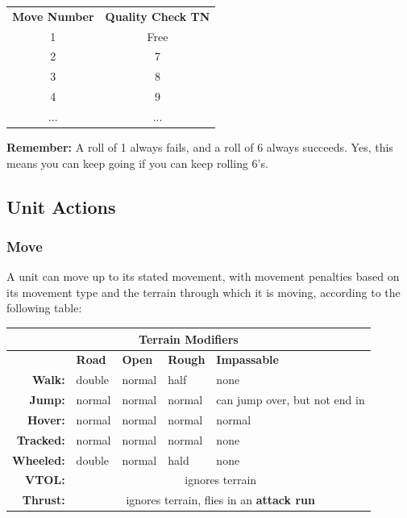\documentclass[12pt,titlepage]{article}
\begin{document}
\begin{multicols}{2}
  \begin{tabular}{cc}
    {\bf Move Number} & {\bf Quality Check TN} \\
    1 & Free \\
    2 & 7 \\
    3 & 8 \\
    4 & 9 \\
    ... & ... \\
  \end{tabular}
      {\bf Remember:} A roll of 1 always fails, and a roll of 6 always
      succeeds. Yes, this means you can keep going if you can keep rolling
      6's.

      \subsection{Unit Actions}
      
      \subsubsection{Move}
      A unit can move up to its stated movement, with movement penalties
      based on its movement type and the terrain through which it is
      moving, according to the following table:

\end{multicols}
\begin{tabular}{rllll}
  \multicolumn{5}{c}{\bf Terrain Modifiers}\\
  \hline
  & {\bf Road} & {\bf Open} & {\bf Rough} & {\bf Impassable} \\
      {\bf Walk:} & double & normal & half & none \\
      {\bf Jump:} & normal & normal & normal & can jump over, but
      not end in \\
      {\bf Hover:} & normal & normal & normal & normal \\
      {\bf Tracked:} & normal & normal & normal & none \\
      {\bf Wheeled:} & double & normal & hald & none \\
      {\bf VTOL:} & \multicolumn{4}{c}{ignores terrain} \\
      {\bf Thrust:} & \multicolumn{4}{c}{ignores terrain, flies in an {\bf
          attack run}}\\
\end{tabular}
\end{document}

